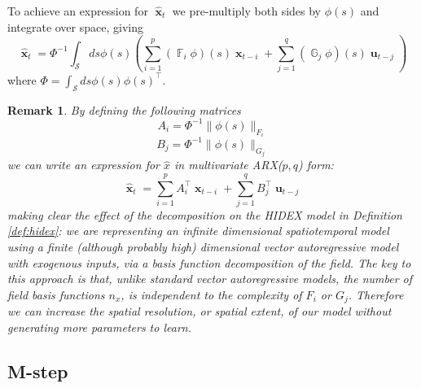 \documentclass{IEEEtran}
\newcommand{\dist}[2]{\|#1\|_{#2}}
\DeclareMathOperator{\F}{\mathbb{F}}
\DeclareMathOperator{\G}{\mathbb{G}}
\DeclareMathOperator{\xvec}{\mathbf{x}}
\DeclareMathOperator{\uvec}{\mathbf{u}}
\newtheorem{remark}{Remark}
\begin{document}
To achieve an expression for $\hat{\xvec}_t$ we pre-multiply both sides by $\phi(s)$ and integrate over space, giving
\begin{equation}
	\hat{\xvec}_t = \Phi^{-1} \int_\mathcal{S}ds \phi(s)\left(\sum_{i=1}^{p}(\F_i \phi)(s)\xvec_{t-i} + \sum_{j=1}^{q}(\G_j\phi)(s)\uvec_{t-j}\right)
\end{equation}
where $\Phi = \int_\mathcal{S}ds\phi(s)\phi(s)^\top$.

\begin{remark}
	By defining the following matrices
	\begin{equation}
		A_i = \Phi^{-1} \dist{\phi(s)}{F_i}
	\end{equation}
	\begin{equation}
		B_j = \Phi^{-1} \dist{\phi(s)}{G_j}
	\end{equation}
	we can write an expression for $\hat{x}$ in multivariate ARX($p,q$) \cite{Ljung} form:
	\begin{equation}
		\hat{\xvec}_t = \sum_{i=1}^{p} A_i^\top \xvec_{t-i} +  \sum_{j=1}^{q} B_j^\top \uvec_{t-j}
	\end{equation}
	making clear the effect of the decomposition on the HIDEX model in Definition \ref{def:hidex}: we are representing an infinite dimensional spatiotemporal model using a finite (although probably high) dimensional vector autoregressive model with exogenous inputs, via a basis function decomposition of the field. The key to this approach is that, unlike standard vector autoregressive models, the number of field basis functions $n_x$, is independent to the complexity of $F_i$ or $G_j$. Therefore we can increase the spatial resolution, or spatial extent, of our model without generating more parameters to learn.
\end{remark}

\subsection{M-step}
\end{document}
